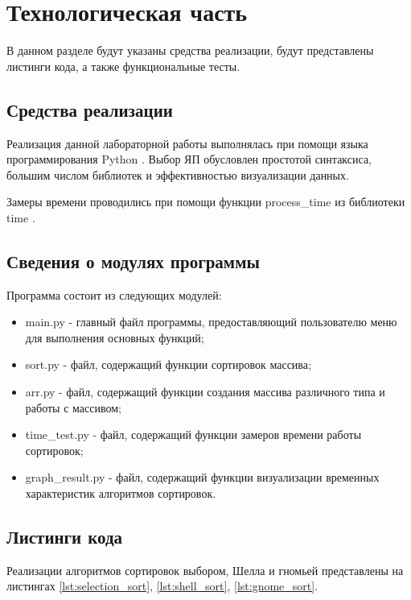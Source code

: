 \chapter{Технологическая часть}

В данном разделе будут указаны средства реализации, будут представлены листинги кода, а также функциональные тесты.

\section{Средства реализации}

Реализация данной лабораторной работы выполнялась при помощи языка программирования Python \cite{python}. Выбор ЯП обусловлен простотой синтаксиса, большим числом библиотек и эффективностью визуализации данных.

Замеры времени проводились при помощи функции process\_time из библиотеки time \cite{python-time}.

\section{Сведения о модулях программы}

Программа состоит из следующих модулей:

\begin{itemize}
	\item main.py - главный файл программы, предоставляющий пользователю меню для выполнения основных функций;
	\item sort.py - файл, содержащий функции сортировок массива;
	\item arr.py - файл, содержащий функции создания массива различного типа и работы с массивом;
	\item time\_test.py - файл, содержащий функции замеров времени работы сортировок;
	\item graph\_result.py - файл, содержащий функции визуализации временных характеристик алгоритмов сортировок.
\end{itemize}

\section{Листинги кода}

Реализации алгоритмов сортировок выбором, Шелла и гномьей представлены на листингах \ref{lst:selection_sort}, \ref{lst:shell_sort}, \ref{lst:gnome_sort}.

